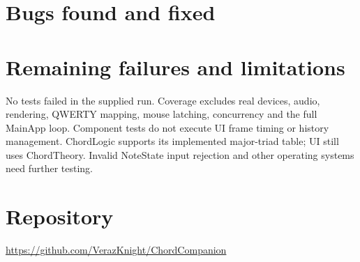 \documentclass[10pt,letterpaper]{article}
\begin{document}
\section{Bugs found and fixed}
\vspace{1cm}

\section{Remaining failures and limitations}
No tests failed in the supplied run. Coverage excludes real devices, audio,
rendering, QWERTY mapping, mouse latching, concurrency and the full MainApp loop.
Component tests do not execute UI frame timing or history management.
ChordLogic supports its implemented major-triad table; UI still uses
ChordTheory. Invalid NoteState input rejection and other operating systems
need further testing.

\section{Repository}
\url{https://github.com/VerazKnight/ChordCompanion}
\end{document}
